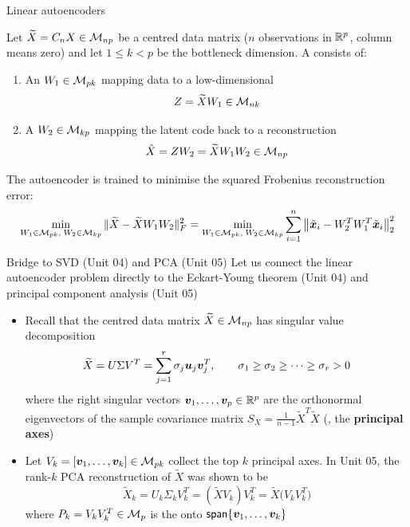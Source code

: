 \documentclass[aspectratio=169]{beamer}\usepackage[]{graphicx}\usepackage[]{xcolor}
\begin{document}
\begin{frame}{Linear autoencoders}
\begin{importantdefinition}
\label{def:linear-autoencoder}
Let $\widetilde{X} = C_n X \in \mathcal{M}_{np}$ be a centred data matrix ($n$ observations in $\mathbb{R}^p$, column means zero) and let $1 \le k < p$ be the bottleneck dimension. A  consists of:
\begin{enumerate}
\item An  $W_1 \in \mathcal{M}_{pk}$ mapping data to a low-dimensional 
\[
Z = \widetilde{X} W_1 \in \mathcal{M}_{nk}
\]
\item A  $W_2 \in \mathcal{M}_{kp}$ mapping the latent code back to a reconstruction
\[
\hat{X} = Z W_2 = \widetilde{X} W_1 W_2 \in \mathcal{M}_{np}
\]
\end{enumerate}
The autoencoder is trained to minimise the squared Frobenius reconstruction error:
\[
\min_{W_1 \in \mathcal{M}_{pk},\; W_2 \in \mathcal{M}_{kp}} \|\widetilde{X} - \widetilde{X} W_1 W_2\|_F^2
= \min_{W_1 \in \mathcal{M}_{pk},\; W_2 \in \mathcal{M}_{kp}} \sum_{i=1}^n \big\|\tilde{\bm{x}}_i - W_2^T W_1^T \tilde{\bm{x}}_i\big\|_2^2
\]
\end{importantdefinition}
\end{frame}


\begin{frame}{Bridge to SVD (Unit 04) and PCA (Unit 05)}
Let us connect the linear autoencoder problem directly to the Eckart-Young theorem (Unit 04) and principal component analysis (Unit 05)
\vfill
\begin{itemize}
\item Recall that the centred data matrix $\widetilde{X} \in \mathcal{M}_{np}$ has singular value decomposition
\[
\widetilde{X} = U \Sigma V^T = \sum_{j=1}^r \sigma_j \bm{u}_j \bm{v}_j^T, \qquad \sigma_1 \ge \sigma_2 \ge \cdots \ge \sigma_r > 0
\]
where the right singular vectors $\bm{v}_1, \ldots, \bm{v}_p \in \mathbb{R}^p$ are the orthonormal eigenvectors of the sample covariance matrix $S_X = \frac{1}{n-1} \widetilde{X}^T \widetilde{X}$ (\ie, the \textbf{principal axes})
\vfill
\item Let $V_k = [\bm{v}_1, \ldots, \bm{v}_k] \in \mathcal{M}_{pk}$ collect the top $k$ principal axes. In Unit 05, the rank-$k$ PCA reconstruction of $\widetilde{X}$ was shown to be
\[
\widetilde{X}_k = U_k \Sigma_k V_k^T = (\widetilde{X} V_k) V_k^T = \widetilde{X} \big(V_k V_k^T\big)
\]
where $P_k = V_k V_k^T \in \mathcal{M}_p$ is the  onto $\mathsf{span}\{\bm{v}_1, \ldots, \bm{v}_k\}$
\end{itemize}
\end{frame}
\end{document}
